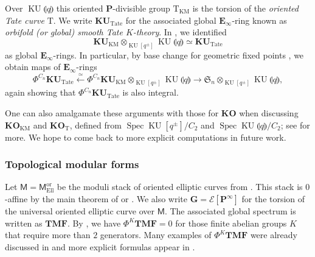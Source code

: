 \documentclass[11pt, a4paper]{article}
\newcommand{\llpar}{\llparenthesis}
\newcommand{\rrpar}{\rrparenthesis}
\newcommand{\Ell}{\mathrm{Ell}}
\newcommand{\km}{{\mathrm{KM}}}
\newcommand{\KM}{\km}
\newcommand{\ori}{\mathrm{or}}
\newcommand{\Tate}{\mathrm{Tate}}
\DeclareMathOperator{\Spec}{Spec}
\newcommand{\1}{\mathbf{1}}
\DeclareMathOperator{\KU}{KU}
\newcommand{\gKU}{{\mathbf{KU}}}
\newcommand{\gKO}{{\mathbf{KO}}}
\newcommand{\gTMF}{{\mathbf{TMF}}}
\newcommand{\E}{\mathbf{E}}
\newcommand{\calE}{\mathcal{E}}
\newcommand{\G}{\mathbf{G}}
\newcommand{\M}{\mathsf{M}}
\renewcommand{\P}{\mathbf{P}}
\newcommand{\T}{\mathrm{T}}
\theoremstyle{plain}
\theoremstyle{definition}
\theoremstyle{remark}\numberwithin{equation}{section}
\begin{document}
Over $\KU\llpar q\rrpar$ this oriented $\P$-divisible group $\T_\KM$ is the torsion of the \emph{oriented Tate curve} $\T$. We write $\gKU_\Tate$ for the associated global $\E_\infty$-ring known as \emph{orbifold (or global) smooth Tate $K$-theory}. In \cite[Thm.D]{globaltate}, we identified
\[\gKU_\KM \otimes_{\KU[q^\pm]} \KU\llpar q \rrpar {\simeq} \gKU_\Tate\]
as global $\E_\infty$-rings. In particular, by base change for geometric fixed points \cite[Thm.5.3.10]{temperedglobal}, we obtain maps of $\E_\infty$-rings
\begin{equation}\label{eq:basechange_to_geoFP_of_Tate_ktheory}\Phi^{C_n} \gKU_\Tate \xleftarrow{\simeq} \Phi^{C_n} \gKU_\KM \otimes_{\KU[q^\pm]} \KU\llpar q \rrpar \to \mathfrak{S}_n \otimes_{\KU[q^\pm]} \KU\llpar q \rrpar,\end{equation}
again showing that $\Phi^{C_n} \gKU_\Tate$ is also integral.

One can also amalgamate these arguments with those for $\gKO$ when discussing $\gKO_\KM$ and $\gKO_\T$, defined from $\Spec \KU[q^\pm] / C_2$ and $\Spec \KU\llpar q \rrpar / C_2$; see \cite[(6.3)]{globaltate} for more. We hope to come back to more explicit computations in future work.

\subsubsection{Topological modular forms}\label{sssec:TMF}
Let $\M = \M_\Ell^\ori$ be the moduli stack of oriented elliptic curves from \cite[]{ec2}. This stack is $0$-affine by the main theorem of \cite{akhilandlennart} or \cite[Thm.A \& Ex.4.2.3.4]{reconstruction}. We also write $\G = \calE[\P^\infty]$ for the torsion of the universal oriented elliptic curve over $\M$. The associated global spectrum is written as $\gTMF$. By \cite[Ex.5.5.20]{temperedglobal}, we have $\Phi^K \gTMF = 0$ for those finite abelian groups $K$ that require more than $2$ generators. Many examples of $\Phi^K \gTMF$ were already discussed in \cite[Ex.5.5.20]{temperedglobal} and more explicit formulas appear in \cite{geometricnorms}.
\end{document}
